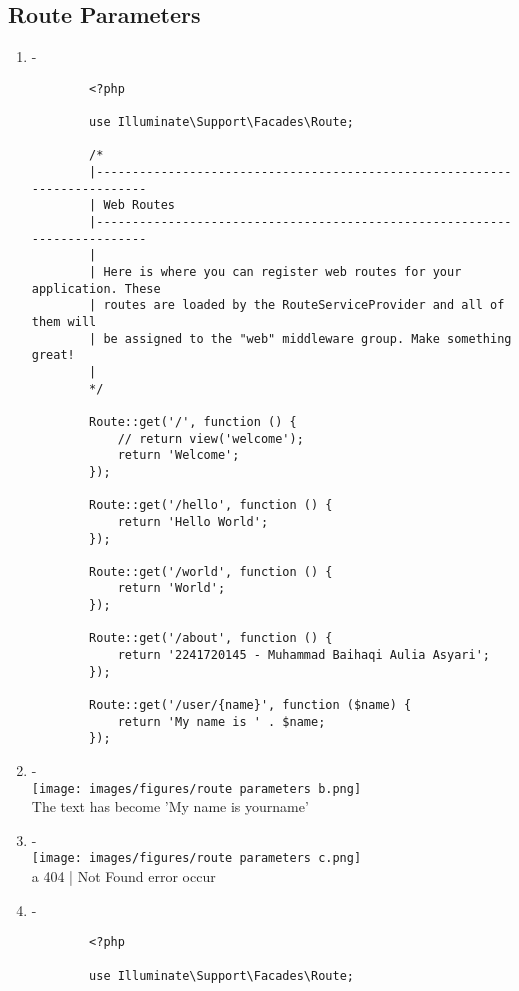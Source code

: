 \documentclass[12pt,titlepage]{article}
\begin{document}
\newpage

\subsection{Route Parameters}
\begin{enumerate}[label=\alph*.]
    \item -
    \begin{verbatim}
        <?php

        use Illuminate\Support\Facades\Route;
        
        /*
        |--------------------------------------------------------------------------
        | Web Routes
        |--------------------------------------------------------------------------
        |
        | Here is where you can register web routes for your application. These
        | routes are loaded by the RouteServiceProvider and all of them will
        | be assigned to the "web" middleware group. Make something great!
        |
        */
        
        Route::get('/', function () {
            // return view('welcome');
            return 'Welcome';
        });
        
        Route::get('/hello', function () {
            return 'Hello World';
        });
        
        Route::get('/world', function () {
            return 'World';
        }); 
        
        Route::get('/about', function () {
            return '2241720145 - Muhammad Baihaqi Aulia Asyari';
        }); 
        
        Route::get('/user/{name}', function ($name) {
            return 'My name is ' . $name;
        }); 
    \end{verbatim}
    \item - \\ \texttt{[image: images/figures/route parameters b.png]} \\ The text has become 'My name is yourname'
    \item - \\ \texttt{[image: images/figures/route parameters c.png]} \\ a 404 | Not Found error occur
    \item -
    \begin{verbatim}
        <?php

        use Illuminate\Support\Facades\Route;
        

\end{verbatim}
\end{enumerate}
\end{document}
